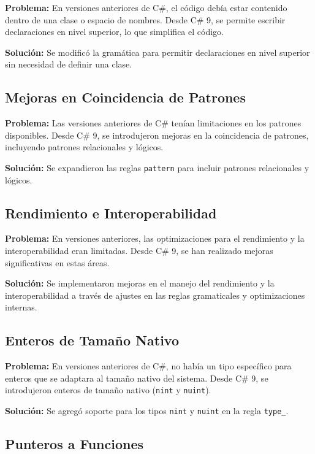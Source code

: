 \textbf{Problema:} En versiones anteriores de C\#, el código debía estar contenido dentro de una clase o espacio de nombres. Desde C\# 9, se permite escribir declaraciones en nivel superior, lo que simplifica el código.

\textbf{Solución:} Se modificó la gramática para permitir declaraciones en nivel superior sin necesidad de definir una clase.

\subsection{Mejoras en Coincidencia de Patrones}

\textbf{Problema:} Las versiones anteriores de C\# tenían limitaciones en los patrones disponibles. Desde C\# 9, se introdujeron mejoras en la coincidencia de patrones, incluyendo patrones relacionales y lógicos.

\textbf{Solución:} Se expandieron las reglas \texttt{pattern} para incluir patrones relacionales y lógicos.

\subsection{Rendimiento e Interoperabilidad}

\textbf{Problema:} En versiones anteriores, las optimizaciones para el rendimiento y la interoperabilidad eran limitadas. Desde C\# 9, se han realizado mejoras significativas en estas áreas.

\textbf{Solución:} Se implementaron mejoras en el manejo del rendimiento y la interoperabilidad a través de ajustes en las reglas gramaticales y optimizaciones internas.

\subsection{Enteros de Tamaño Nativo}

\textbf{Problema:} En versiones anteriores de C\#, no había un tipo específico para enteros que se adaptara al tamaño nativo del sistema. Desde C\# 9, se introdujeron enteros de tamaño nativo (\texttt{nint} y \texttt{nuint}).

\textbf{Solución:} Se agregó soporte para los tipos \texttt{nint} y \texttt{nuint} en la regla \texttt{type\_}.

\subsection{Punteros a Funciones}

